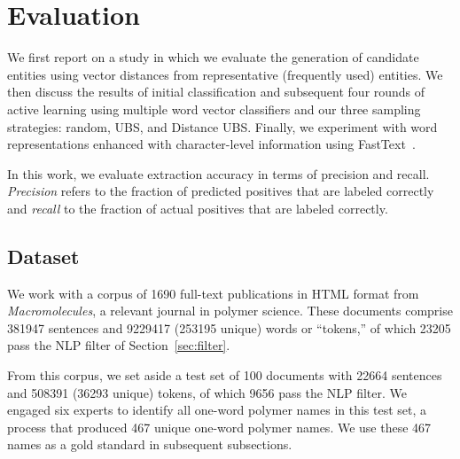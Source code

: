 \section{Evaluation}
\label{sect:apner_results}
We first report on a study in which we evaluate the generation of candidate entities using vector distances from representative (frequently used) entities. 
We then discuss the results of initial classification and subsequent four rounds of active learning using multiple word vector classifiers and our three sampling strategies: random, UBS, and Distance UBS.
Finally, we experiment with word representations enhanced with character-level information using FastText~\cite{bojanowski2016enriching,joulin2016bag}.

In this work, we evaluate extraction accuracy in terms of precision and recall.
\emph{Precision} refers to the fraction of predicted
positives that are labeled correctly and
\emph{recall} to the fraction of actual positives that
are labeled correctly.

\subsection{Dataset}\label{sec:dataset}

We work with a corpus of \num{1690} full-text publications in HTML format from \textit{Macromolecules}, 
a relevant journal in polymer science.
These documents comprise \num{381947} sentences and \num{9229417} (\num{253195} unique) words or ``tokens,''
of which \num{23205} pass the NLP filter of Section~\ref{sec:filter}.

From this corpus, 
we set aside a test set of 100 documents with  \num{22664} sentences and \num{508391} (\num{36293} unique) tokens,
of which \num{9656} pass the NLP filter.
We engaged six experts to identify all one-word polymer names in this test set,
a process that produced 467 unique one-word polymer names.
We use these 467 names as a gold standard in subsequent subsections.


